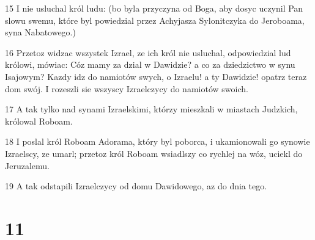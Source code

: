 \par 15 I nie usluchal król ludu: (bo byla przyczyna od Boga, aby dosyc uczynil Pan slowu swemu, które byl powiedzial przez Achyjasza Sylonitczyka do Jeroboama, syna Nabatowego.)
\par 16 Przetoz widzac wszystek Izrael, ze ich król nie usluchal, odpowiedzial lud królowi, mówiac: Cóz mamy za dzial w Dawidzie? a co za dziedzictwo w synu Isajowym? Kazdy idz do namiotów swych, o Izraelu! a ty Dawidzie! opatrz teraz dom swój. I rozeszli sie wszyscy Izraelczycy do namiotów swoich.
\par 17 A tak tylko nad synami Izraelskimi, którzy mieszkali w miastach Judzkich, królowal Roboam.
\par 18 I poslal król Roboam Adorama, który byl poborca, i ukamionowali go synowie Izraelscy, ze umarl; przetoz król Roboam wsiadlszy co rychlej na wóz, uciekl do Jeruzalemu.
\par 19 A tak odstapili Izraelczycy od domu Dawidowego, az do dnia tego.

\chapter{11}

